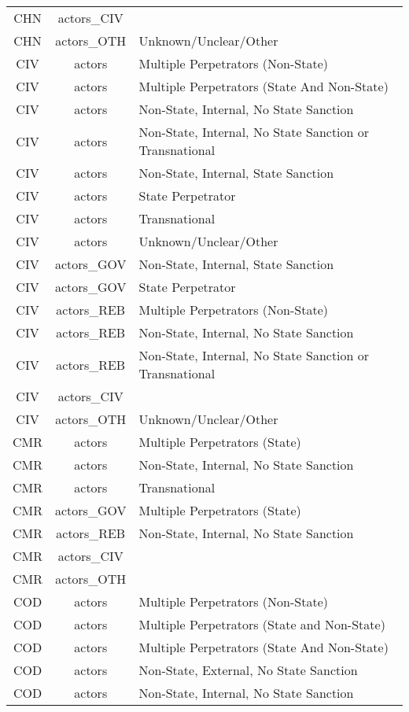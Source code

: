\documentclass[12pt]{article}
\begin{document}
\begin{center}
\begin{longtable}{|c|c|p{10cm}|}
  CHN & actors\_CIV &  \\ 
  CHN & actors\_OTH & Unknown/Unclear/Other \\ 
  CIV & actors & Multiple Perpetrators (Non-State) \\ 
  CIV & actors & Multiple Perpetrators (State And Non-State) \\ 
  CIV & actors & Non-State, Internal, No State Sanction \\ 
  CIV & actors & Non-State, Internal, No State Sanction or Transnational \\ 
  CIV & actors & Non-State, Internal, State Sanction \\ 
  CIV & actors & State Perpetrator \\ 
  CIV & actors & Transnational \\ 
  CIV & actors & Unknown/Unclear/Other \\ 
  CIV & actors\_GOV & Non-State, Internal, State Sanction \\ 
  CIV & actors\_GOV & State Perpetrator \\ 
  CIV & actors\_REB & Multiple Perpetrators (Non-State) \\ 
  CIV & actors\_REB & Non-State, Internal, No State Sanction \\ 
  CIV & actors\_REB & Non-State, Internal, No State Sanction or Transnational \\ 
  CIV & actors\_CIV &  \\ 
  CIV & actors\_OTH & Unknown/Unclear/Other \\ 
  CMR & actors & Multiple Perpetrators (State) \\ 
  CMR & actors & Non-State, Internal, No State Sanction \\ 
  CMR & actors & Transnational \\ 
  CMR & actors\_GOV & Multiple Perpetrators (State) \\ 
  CMR & actors\_REB & Non-State, Internal, No State Sanction \\ 
  CMR & actors\_CIV &  \\ 
  CMR & actors\_OTH &  \\ 
  COD & actors & Multiple Perpetrators (Non-State) \\ 
  COD & actors & Multiple Perpetrators (State and Non-State) \\ 
  COD & actors & Multiple Perpetrators (State And Non-State) \\ 
  COD & actors & Non-State, External, No State Sanction \\ 
  COD & actors & Non-State, Internal, No State Sanction \\ 

\end{longtable}
\end{center}
\end{document}
